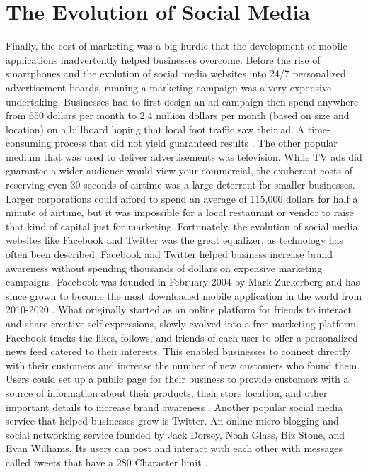 \documentclass{article}
\begin{document}
\section{The Evolution of Social Media}
Finally, the cost of marketing was a big hurdle that the development of mobile applications inadvertently helped businesses overcome. Before the rise of smartphones and the evolution of social media websites into 24/7 personalized advertisement boards, running a marketing campaign was a very expensive undertaking. Businesses had to first design an ad campaign then spend anywhere from 650 dollars per month to 2.4 million dollars per month (based on size and location) on a billboard hoping that local foot traffic saw their ad. A time-consuming process that did not yield guaranteed results \cite{siemasko_2013}. The other popular medium that was used to deliver advertisements was television. While TV ads did guarantee a wider audience would view your commercial, the exuberant costs of reserving even 30 seconds of airtime was a large deterrent for smaller businesses. Larger corporations could afford to spend an average of 115,000 dollars for half a minute of airtime, but it was impossible for a local restaurant or vendor to raise that kind of capital just for marketing. Fortunately, the evolution of social media websites like Facebook and Twitter was the great equalizer, as technology has often been described. Facebook and Twitter helped business increase brand awareness without spending thousands of dollars on expensive marketing campaigns. Facebook was founded in February 2004 by Mark Zuckerberg and has since grown to become the most downloaded mobile application in the world from 2010-2020 \cite{miller_2019}. What originally started as an online platform for friends to interact and share creative self-expressions, slowly evolved into a free marketing platform. Facebook tracks the likes, follows, and friends of each user to offer a personalized news feed catered to their interests. This enabled businesses to connect directly with their customers and increase the number of new customers who found them. Users could set up a public page for their business to provide customers with a source of information about their products, their store location, and other important details to increase brand awareness \cite{johnston_2021}. Another popular social media service that helped businesses grow is Twitter. An online micro-blogging and social networking service founded by Jack Dorsey, Noah Glass, Biz Stone, and Evan Williams. Its users can post and interact with each other with messages called tweets that have a 280 Character limit \cite{reiff_2021}.
\end{document}

